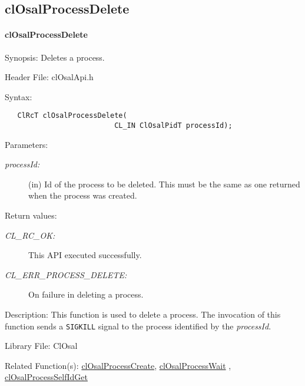 \newpage
\subsection{clOsalProcessDelete}
\hypertarget{pageosal142}{}\paragraph{cl\-Osal\-Process\-Delete}\label{pageosal142}
\begin{Desc}
\item[Synopsis:]Deletes a process.\end{Desc}
\begin{Desc}
\item[Header File:]clOsalApi.h\end{Desc}
\begin{Desc}
\item[Syntax:]

\footnotesize\begin{verbatim}   ClRcT clOsalProcessDelete(
                          CL_IN ClOsalPidT processId);
\end{verbatim}
\normalsize
\end{Desc}
\begin{Desc}
\item[Parameters:]
\begin{description}
\item[{\em process\-Id:}](in) Id of the process to be deleted. This must be the same as one returned when the process was created.\end{description}
\end{Desc}
\begin{Desc}
\item[Return values:]
\begin{description}
\item[{\em CL\_\-RC\_\-OK:}]This API executed successfully. \item[{\em CL\_\-ERR\_\-PROCESS\_\-DELETE:}]On failure in deleting a process.\end{description}
\end{Desc}
\begin{Desc}
\item[Description:]This function is used to delete a process. The invocation of this function sends a {\tt SIGKILL} signal to the process identified by the {\em process\-Id\/}.\end{Desc}
\begin{Desc}
\item[Library File:]Cl\-Osal\end{Desc}
\begin{Desc}
\item[Related Function(s):]\hyperlink{pageosal139}{cl\-Osal\-Process\-Create}, \hyperlink{pageosal143}{cl\-Osal\-Process\-Wait} , 
\hyperlink{pageosal144}{cl\-Osal\-Process\-Self\-Id\-Get} \end{Desc}

